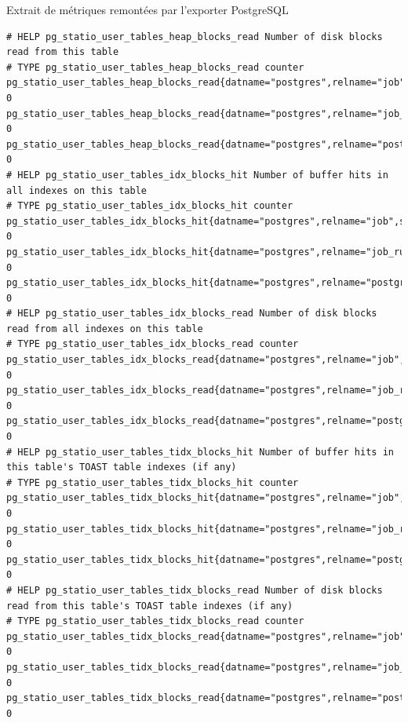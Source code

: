\begin{frame}[fragile,shrink=5]{Extrait de métriques remontées par l'exporter PostgreSQL}
\begin{Verbatim}[commandchars=\\\{\}]
# HELP pg_statio_user_tables_heap_blocks_read Number of disk blocks read from this table
# TYPE pg_statio_user_tables_heap_blocks_read counter
pg_statio_user_tables_heap_blocks_read{datname="postgres",relname="job",schemaname="cron"} 0
pg_statio_user_tables_heap_blocks_read{datname="postgres",relname="job_run_details",schemaname="cron"} 0
pg_statio_user_tables_heap_blocks_read{datname="postgres",relname="postgres_log",schemaname="public"} 0
# HELP pg_statio_user_tables_idx_blocks_hit Number of buffer hits in all indexes on this table
# TYPE pg_statio_user_tables_idx_blocks_hit counter
pg_statio_user_tables_idx_blocks_hit{datname="postgres",relname="job",schemaname="cron"} 0
pg_statio_user_tables_idx_blocks_hit{datname="postgres",relname="job_run_details",schemaname="cron"} 0
pg_statio_user_tables_idx_blocks_hit{datname="postgres",relname="postgres_log",schemaname="public"} 0
# HELP pg_statio_user_tables_idx_blocks_read Number of disk blocks read from all indexes on this table
# TYPE pg_statio_user_tables_idx_blocks_read counter
pg_statio_user_tables_idx_blocks_read{datname="postgres",relname="job",schemaname="cron"} 0
pg_statio_user_tables_idx_blocks_read{datname="postgres",relname="job_run_details",schemaname="cron"} 0
pg_statio_user_tables_idx_blocks_read{datname="postgres",relname="postgres_log",schemaname="public"} 0
# HELP pg_statio_user_tables_tidx_blocks_hit Number of buffer hits in this table's TOAST table indexes (if any)
# TYPE pg_statio_user_tables_tidx_blocks_hit counter
pg_statio_user_tables_tidx_blocks_hit{datname="postgres",relname="job",schemaname="cron"} 0
pg_statio_user_tables_tidx_blocks_hit{datname="postgres",relname="job_run_details",schemaname="cron"} 0
pg_statio_user_tables_tidx_blocks_hit{datname="postgres",relname="postgres_log",schemaname="public"} 0
# HELP pg_statio_user_tables_tidx_blocks_read Number of disk blocks read from this table's TOAST table indexes (if any)
# TYPE pg_statio_user_tables_tidx_blocks_read counter
pg_statio_user_tables_tidx_blocks_read{datname="postgres",relname="job",schemaname="cron"} 0
pg_statio_user_tables_tidx_blocks_read{datname="postgres",relname="job_run_details",schemaname="cron"} 0
pg_statio_user_tables_tidx_blocks_read{datname="postgres",relname="postgres_log",schemaname="public"} 0
\end{Verbatim}

\end{frame}


